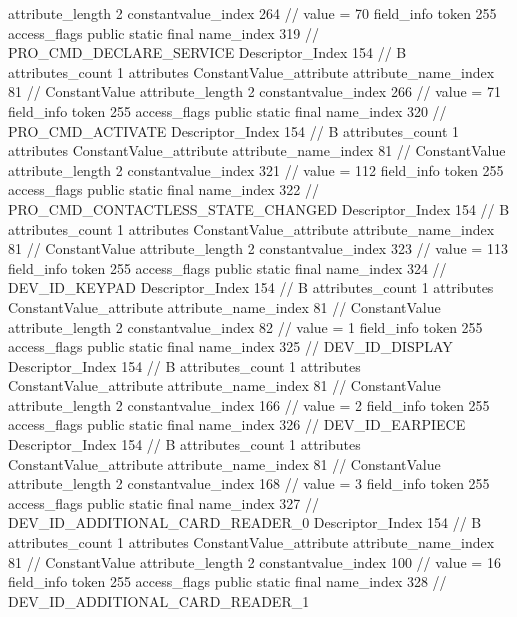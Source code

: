 {{{{{{{					attribute_length	2
					constantvalue_index	264		// value = 70
				}
				}
			}
			field_info {
				token	255
				access_flags	public static final
				name_index	319		// PRO_CMD_DECLARE_SERVICE
				Descriptor_Index	154		// B
				attributes_count	1
				attributes {
				ConstantValue_attribute {
					attribute_name_index	81		// ConstantValue
					attribute_length	2
					constantvalue_index	266		// value = 71
				}
				}
			}
			field_info {
				token	255
				access_flags	public static final
				name_index	320		// PRO_CMD_ACTIVATE
				Descriptor_Index	154		// B
				attributes_count	1
				attributes {
				ConstantValue_attribute {
					attribute_name_index	81		// ConstantValue
					attribute_length	2
					constantvalue_index	321		// value = 112
				}
				}
			}
			field_info {
				token	255
				access_flags	public static final
				name_index	322		// PRO_CMD_CONTACTLESS_STATE_CHANGED
				Descriptor_Index	154		// B
				attributes_count	1
				attributes {
				ConstantValue_attribute {
					attribute_name_index	81		// ConstantValue
					attribute_length	2
					constantvalue_index	323		// value = 113
				}
				}
			}
			field_info {
				token	255
				access_flags	public static final
				name_index	324		// DEV_ID_KEYPAD
				Descriptor_Index	154		// B
				attributes_count	1
				attributes {
				ConstantValue_attribute {
					attribute_name_index	81		// ConstantValue
					attribute_length	2
					constantvalue_index	82		// value = 1
				}
				}
			}
			field_info {
				token	255
				access_flags	public static final
				name_index	325		// DEV_ID_DISPLAY
				Descriptor_Index	154		// B
				attributes_count	1
				attributes {
				ConstantValue_attribute {
					attribute_name_index	81		// ConstantValue
					attribute_length	2
					constantvalue_index	166		// value = 2
				}
				}
			}
			field_info {
				token	255
				access_flags	public static final
				name_index	326		// DEV_ID_EARPIECE
				Descriptor_Index	154		// B
				attributes_count	1
				attributes {
				ConstantValue_attribute {
					attribute_name_index	81		// ConstantValue
					attribute_length	2
					constantvalue_index	168		// value = 3
				}
				}
			}
			field_info {
				token	255
				access_flags	public static final
				name_index	327		// DEV_ID_ADDITIONAL_CARD_READER_0
				Descriptor_Index	154		// B
				attributes_count	1
				attributes {
				ConstantValue_attribute {
					attribute_name_index	81		// ConstantValue
					attribute_length	2
					constantvalue_index	100		// value = 16
				}
				}
			}
			field_info {
				token	255
				access_flags	public static final
				name_index	328		// DEV_ID_ADDITIONAL_CARD_READER_1
}}}}}
